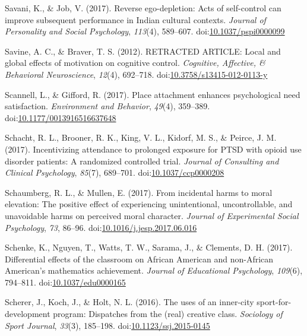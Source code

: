 \documentclass[english,man]{apa6}
\theoremstyle{definition}
\theoremstyle{definition}
\theoremstyle{definition}
\theoremstyle{remark}
\begin{document}
\hypertarget{ref-Savani2017}{}
Savani, K., \& Job, V. (2017). Reverse ego-depletion: Acts of
self-control can improve subsequent performance in Indian cultural
contexts. \emph{Journal of Personality and Social Psychology},
\emph{113}(4), 589--607.
doi:\href{https://doi.org/10.1037/pspi0000099}{10.1037/pspi0000099}

\hypertarget{ref-Savine2012}{}
Savine, A. C., \& Braver, T. S. (2012). RETRACTED ARTICLE: Local and
global effects of motivation on cognitive control. \emph{Cognitive,
Affective, \& Behavioral Neuroscience}, \emph{12}(4), 692--718.
doi:\href{https://doi.org/10.3758/s13415-012-0113-y}{10.3758/s13415-012-0113-y}

\hypertarget{ref-Scannell2017}{}
Scannell, L., \& Gifford, R. (2017). Place attachment enhances
psychological need satisfaction. \emph{Environment and Behavior},
\emph{49}(4), 359--389.
doi:\href{https://doi.org/10.1177/0013916516637648}{10.1177/0013916516637648}

\hypertarget{ref-Schacht2017a}{}
Schacht, R. L., Brooner, R. K., King, V. L., Kidorf, M. S., \& Peirce,
J. M. (2017). Incentivizing attendance to prolonged exposure for PTSD
with opioid use disorder patients: A randomized controlled trial.
\emph{Journal of Consulting and Clinical Psychology}, \emph{85}(7),
689--701.
doi:\href{https://doi.org/10.1037/ccp0000208}{10.1037/ccp0000208}

\hypertarget{ref-Schaumberg2017}{}
Schaumberg, R. L., \& Mullen, E. (2017). From incidental harms to moral
elevation: The positive effect of experiencing unintentional,
uncontrollable, and unavoidable harms on perceived moral character.
\emph{Journal of Experimental Social Psychology}, \emph{73}, 86--96.
doi:\href{https://doi.org/10.1016/j.jesp.2017.06.016}{10.1016/j.jesp.2017.06.016}

\hypertarget{ref-Schenke2017}{}
Schenke, K., Nguyen, T., Watts, T. W., Sarama, J., \& Clements, D. H.
(2017). Differential effects of the classroom on African American and
non-African American's mathematics achievement. \emph{Journal of
Educational Psychology}, \emph{109}(6), 794--811.
doi:\href{https://doi.org/10.1037/edu0000165}{10.1037/edu0000165}

\hypertarget{ref-Scherer2016}{}
Scherer, J., Koch, J., \& Holt, N. L. (2016). The uses of an inner-city
sport-for-development program: Dispatches from the (real) creative
class. \emph{Sociology of Sport Journal}, \emph{33}(3), 185--198.
doi:\href{https://doi.org/10.1123/ssj.2015-0145}{10.1123/ssj.2015-0145}
\end{document}
